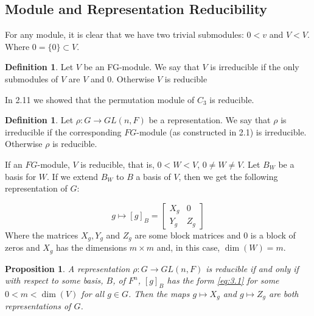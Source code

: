 \documentclass[11pt, notitlepage]{article}
\numberwithin{equation}{section}
\theoremstyle{plain}
\newtheorem{proposition}[theorem]{Proposition}
\theoremstyle{definition}
\newtheorem{definition}[theorem]{Definition}
\begin{document}
\subsection{Module and Representation Reducibility}

For any module, it is clear that we have two trivial submodules: $0<v$ and $V<V$. Where $0 = \{0\}\subset V$.

\begin{definition}
	Let $V$ be an FG-module. We say that $V$ is irreducible if the only submodules of $V$ are $V$ and $0$. Otherwise $V$ is reducible
\end{definition}

In 2.11 we showed that the permutation module of $C_3$ is reducible.

\begin{definition}
	Let $\rho:G\rightarrow GL(n,F)$ be a representation. We say that $\rho$ is irreducible if the corresponding $FG$-module (as constructed in 2.1) is irreducible. Otherwise $\rho$ is reducible.
\end{definition}

If an $FG$-module, $V$  is reducible, that is, $0<W<V$, $0\neq W\neq V$. Let $B_W$ be a basis for $W$. If we extend $B_W$ to $B$ a basis of $V$, then we get the following representation of $G$:

\begin{equation}\label{eq:3.1}
	g\mapsto [g]_B = \begin{bmatrix}
		X_g & 0\\Y_g & Z_g
	\end{bmatrix}
\end{equation}
Where the matrices $X_g,Y_g$ and $Z_g$ are some block matrices and $0$ is a block of zeros and $X_g$ has the dimensions $m\times m$ and, in this case, $\operatorname{dim}(W)=m$.
	
\begin{proposition}
	A representation $\rho:G\rightarrow GL(n,F)$ is reducible if and only if with respect to some basis, $B$, of $F^n$, $[g]_B$ has the form \ref{eq:3.1} for some $0<m<\operatorname{dim}(V)$ for all $g\in G$. Then the maps $g\mapsto X_g$ and $g\mapsto Z_g$ are both representations of $G$.
\end{proposition}
\end{document}
